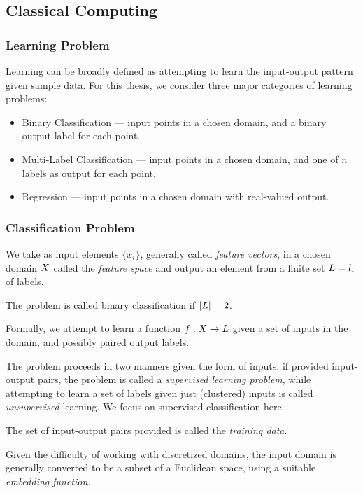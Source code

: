 
\subsection{Classical Computing}
\subsubsection{Learning Problem}
Learning \cite{cristianini2000introduction} can be broadly defined as attempting
to learn the input-output pattern given sample data. For this thesis, we
consider three major categories of learning problems:

\begin{itemize}
    \item Binary Classification --- input points in a chosen domain, and a
    binary output label for each point.
    \item Multi-Label Classification --- input points in a chosen domain, and
    one of \(n\) labels as output for each point.
    \item Regression --- input points in a chosen domain with real-valued
    output.
\end{itemize}

\subsubsection{Classification Problem}
We take as input elements \(\{x_i\}\), generally called \emph{feature vectors},
in a chosen domain \(X\) called the \emph{feature space} and output
an element from a finite set \(L = {l_i}\) of labels.

The problem is called binary classification if \(\absolutevalue{\labelset} =
2\).

Formally, we attempt to learn a function \(f: X \to L\)
given a set of inputs in the domain, and possibly paired output labels.

The problem proceeds in two manners given the form of inputs: if provided
input-output pairs, the problem is called a \emph{supervised learning problem},
while attempting to learn a set of labels given just (clustered) inputs is
called \emph{unsupervised} learning. We focus on supervised classification here.

The set of input-output pairs provided is called the \emph{training data}.

Given the difficulty of working with discretized domains, the input domain is
generally converted to be a subset of a Euclidean space, using a suitable
\emph{embedding function}.

